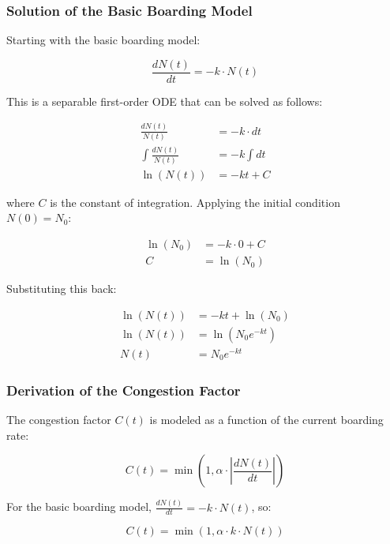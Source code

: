 \documentclass[12pt,a4paper]{article}
\begin{document}
\subsubsection{Solution of the Basic Boarding Model}

Starting with the basic boarding model:

\begin{equation}
\frac{dN(t)}{dt} = -k \cdot N(t)
\end{equation}

This is a separable first-order ODE that can be solved as follows:

\begin{align}
\frac{dN(t)}{N(t)} &= -k \cdot dt \\
\int \frac{dN(t)}{N(t)} &= -k \int dt \\
\ln(N(t)) &= -kt + C
\end{align}

where $C$ is the constant of integration. Applying the initial condition $N(0) = N_0$:

\begin{align}
\ln(N_0) &= -k \cdot 0 + C \\
C &= \ln(N_0)
\end{align}

Substituting this back:

\begin{align}
\ln(N(t)) &= -kt + \ln(N_0) \\
\ln(N(t)) &= \ln(N_0 e^{-kt}) \\
N(t) &= N_0 e^{-kt}
\end{align}

\subsubsection{Derivation of the Congestion Factor}

The congestion factor $C(t)$ is modeled as a function of the current boarding rate:

\begin{equation}
C(t) = \min\left(1, \alpha \cdot \left| \frac{dN(t)}{dt} \right| \right)
\end{equation}

For the basic boarding model, $\frac{dN(t)}{dt} = -k \cdot N(t)$, so:

\begin{equation}
C(t) = \min\left(1, \alpha \cdot k \cdot N(t) \right)
\end{equation}
\end{document}
